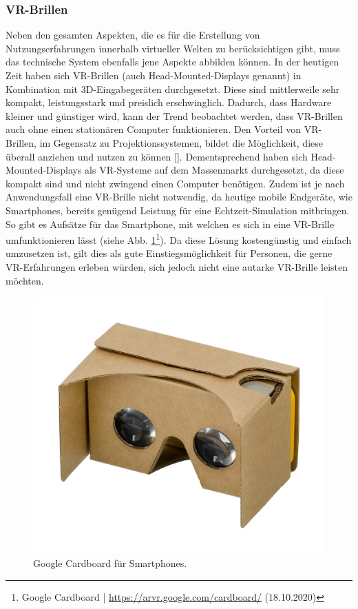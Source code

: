 \documentclass[a4paper,12pt,oneside]{article}
\begin{document}
      \subsubsection{VR-Brillen}
        Neben den gesamten Aspekten, die es für die Erstellung von
        Nutzungserfahrungen innerhalb virtueller Welten zu berücksichtigen gibt, 
        muss das technische System ebenfalls jene Aspekte
        abbilden können. In der heutigen Zeit haben sich VR-Brillen 
        (auch Head-Mounted-Displays genannt) in 
        Kombination mit 3D-Eingabegeräten durchgesetzt. Diese sind mittlerweile sehr kompakt,
        leistungsstark und preislich erschwinglich. Dadurch, dass Hardware kleiner
        und günstiger wird, kann der Trend beobachtet werden, dass VR-Brillen auch ohne
        einen stationären Computer funktionieren.
        Den Vorteil von VR-Brillen, im Gegensatz zu Projektionssystemen, bildet die 
        Möglichkeit, diese überall anziehen und nutzen zu können [\cite[129]{Dorner2013}].
        Dementsprechend haben sich Head-Mounted-Displays als VR-Systeme auf dem Massenmarkt
        durchgesetzt, da diese kompakt sind und nicht zwingend einen Computer benötigen.
        Zudem ist je nach Anwendungsfall eine VR-Brille nicht notwendig, da heutige 
        mobile Endgeräte, wie Smartphones, bereits genügend Leistung für eine 
        Echtzeit-Simulation mitbringen. So gibt es Aufsätze für das Smartphone,
        mit welchen es sich in eine VR-Brille umfunktionieren lässt (siehe Abb. \ref{fig:google-cardboard}\footnote{Google Cardboard | \url{https://arvr.google.com/cardboard/} (18.10.2020)}).
        Da diese Lösung kostengünstig und einfach umzusetzen ist, gilt dies als 
        gute Einstiegsmöglichkeit für Personen, die gerne
        VR-Erfahrungen erleben würden, sich jedoch nicht eine autarke VR-Brille leisten
        möchten.
        \begin{figure}[t]
          \centering
          \includegraphics{img/google-cardboard.jpg}
          \caption{Google Cardboard für Smartphones.}
          \label{fig:google-cardboard}
        \end{figure}
\end{document}
